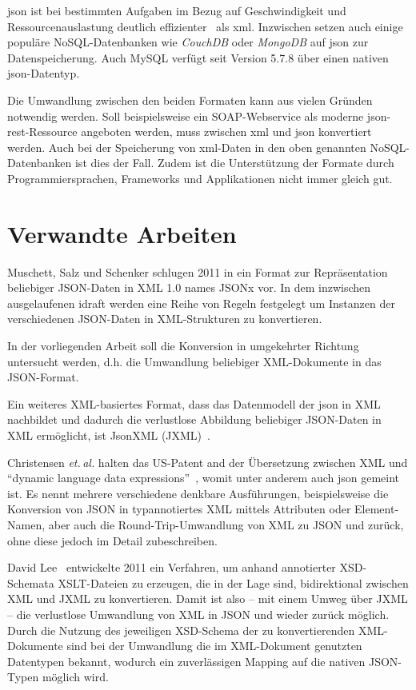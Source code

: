 \acrshort{json} ist bei bestimmten Aufgaben im Bezug auf Geschwindigkeit und
Ressourcenauslastung deutlich effizienter~\cite{nurseitov2009comparison} als
\acrshort{xml}\@. Inzwischen setzen auch einige populäre NoSQL-Datenbanken wie
\emph{CouchDB} oder \emph{MongoDB} auf \acrshort{json} zur Datenspeicherung. Auch
MySQL verfügt seit Version 5.7.8 über einen nativen \acrshort{json}-Datentyp.

Die Umwandlung zwischen den beiden Formaten kann aus vielen Gründen
notwendig werden. Soll beispielsweise ein SOAP-Webservice als moderne
\acrshort{json}-\acrshort{rest}-Ressource angeboten werden, muss zwischen \acrshort{xml} und \acrshort{json} konvertiert
werden. Auch bei der Speicherung von \acrshort{xml}-Daten in den oben genannten NoSQL-Datenbanken
ist dies der Fall. Zudem ist die Unterstützung der Formate durch
Programmiersprachen, Frameworks und Applikationen nicht immer gleich gut.

\section{Verwandte Arbeiten}

Muschett, Salz und Schenker schlugen 2011 in ein Format zur Repräsentation beliebiger JSON-Daten in XML 1.0 names JSONx vor. In dem inzwischen ausgelaufenen \gls{idraft} werden eine Reihe von Regeln festgelegt um Instanzen der verschiedenen JSON-Daten in XML-Strukturen zu konvertieren.~\cite{jsonx}

In der vorliegenden Arbeit soll die Konversion in umgekehrter Richtung untersucht werden, d.h. die Umwandlung beliebiger XML-Dokumente in das JSON-Format.

Ein weiteres XML-basiertes Format, dass das Datenmodell der \acrfull{json} in XML nachbildet und dadurch die verlustlose Abbildung beliebiger JSON-Daten in XML ermöglicht, ist JsonXML (JXML)~\cite{jxml}.

Christensen \emph{et.\,al.} halten das US-Patent and der Übersetzung zwischen XML und \enquote{dynamic language data expressions}~\cite{US7761484}, womit unter anderem auch \acrshort{json} gemeint ist. Es nennt mehrere verschiedene denkbare Ausführungen, beispielsweise die Konversion von JSON in typannotiertes XML mittels Attributen oder Element-Namen, aber auch die Round-Trip-Umwandlung von XML zu JSON und zurück, ohne diese jedoch im Detail zubeschreiben.

David Lee~\cite{lee2011jxon} entwickelte 2011 ein Verfahren, um anhand annotierter XSD-Schemata XSLT-Dateien zu erzeugen, die in der Lage sind, bidirektional zwischen XML und JXML zu konvertieren.  Damit ist also -- mit einem Umweg über JXML -- die verlustlose Umwandlung von XML in JSON und wieder zurück möglich.
Durch die Nutzung des jeweiligen XSD-Schema der zu konvertierenden XML-Dokumente sind bei der Umwandlung die im XML-Dokument genutzten Datentypen bekannt, wodurch ein zuverlässigen Mapping auf die nativen JSON-Typen möglich wird.

